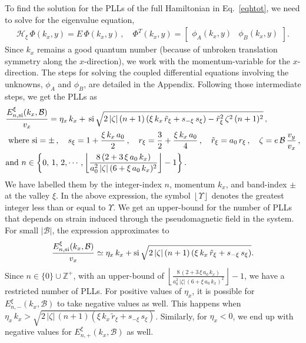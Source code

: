 \documentclass[aps,prb, onecolumn, nofootinbib, citeautoscript,10pt]{revtex4-2}
\def \nn{\nonumber \\}
\begin{document}
To find the solution for the PLLs of the full Hamiltonian in Eq.~\eqref{eqhtot}, we need to solve for the eigenvalue equation,
\begin{align}
\mathcal{H}_{\xi} \,\Phi (k_x, y) = E \,\Phi (k_x, y)\,,\quad
\Phi^T (k_x, y) = \begin{bmatrix}
\phi_A (k_x, y) & \phi_B(k_x, y) 
\end{bmatrix} .
\end{align}
Since $k_x$ remains a good quantum number (because of unbroken translation symmetry along the $x$-direction), we work with the momentum-variable for the $x$-direction. The steps for solving the coupled differential equations involving the unknowns, $\phi_A$ and $\phi_B$, are detailed in the Appendix. Following those intermediate steps, we get the PLLs as
\begin{align}
& \frac{  E^{\xi}_{n, \rm{si}} (k_x, \mathcal B) } {v_x} =  
\eta_x \,   k_x
+ \,\text{si}\,\sqrt{ 2\,|\zeta|\,(n+1) \left (\xi\,k_x \, \tilde r_\xi + s_{-\xi} \, s_\xi \right ) - \tilde r_\xi^2 \, \zeta^2\,(n+1)^2 }  \,,\nn
& \text{ where } \text{si} = \pm \,, \quad
s_\xi = 1 + \frac{\xi \, k_x\, a_0 } {2}\,, \quad
r_\xi = \frac{3}{2} + \frac{\xi \, k_x\, a_0 } {4}\,,\quad
\tilde{r}_\xi = a_0 \, r_\xi  \,, \quad \zeta =  e \, {\mathcal B} \, \frac{v_y}{v_x}\,,
\nn & \text{and } n \in \left\{ 0, \,1, \, 2,\cdots, 
\left\lfloor\frac{8 \,(2  + 3 \, \xi \,a_0\, k_x)}   { a_0^2\,|\zeta| \,(6 +\xi \,a_0\,  k_x)^2} \right\rfloor - 1 \right\}.
\label{eqevals}
\end{align}
We have labelled them by the integer-index $n$, momentum $k_x$, and band-index $\pm$ at the valley $\xi$. 
In the above expression, the symbol $\left \lfloor  \Upsilon \right \rfloor$ denotes the greatest integer less than or equal to $\Upsilon$.
We get an upper-bound for the number of PLLs that depends on strain induced through the pseudomagnetic field in the system. For small $ |\mathcal{B}| $, the expression approximates to
\begin{align}
\frac{ E^{\xi}_{n, \rm{si}} (k_x, \mathcal B) } {v_x} \simeq    \eta_x \,   k_x 
+ \text{si}\, \sqrt{ 2\,|\zeta|\,(n+1) \left (\xi\,k_x \, \tilde r_\xi + s_{-\xi} \, s_\xi \right ) } .
\label{eqevalssmall}
\end{align}
Since $n\in \lbrace 0 \rbrace \cup \mathbb{Z}^+$, with an upper-bound of $
\left\lfloor\frac{8 \,(2  + 3 \, \xi \,a_0\, k_x)}   { a_0^2\,|\zeta| \,(6 +\xi \,a_0\,  k_x)^2} \right\rfloor - 1$, we have a restricted number of PLLs. For positive values of $\eta_x$, it is possible for $E^\xi_{n, -} (k_x, \mathcal B)$
to take negative values as well. This happens when $ \eta_x \,  k_x  > \sqrt{2\,|\zeta|\,(n+1) \left (\xi\,k_x \, \tilde r_\xi + s_{-\xi} \, s_\xi \right )} $. Similarly, for $\eta_x<0$, we end up with negative values for $ E^\xi_{n, +}
( k_x, \mathcal B )$ as well.
\end{document}
